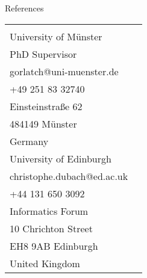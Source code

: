\documentclass[letterpaper]{resume} %
\begin{document}
\vspace{3em}
\begin{rSection}{References}

\begin{center}
  \begin{tabular}{ll}
    \begin{minipage}[t]{.45\linewidth}
      {\bf Prof. Sergei Gorlatch}\\
      University of M\"unster\\[.5em]
      PhD Supervisor\\[1em]
      gorlatch@uni-muenster.de\\
      +49 251 83 32740\\[1em]
      Einsteinstra{\ss}e 62\\
      484149 M\"unster\\
      Germany
    \end{minipage} &
    \begin{minipage}[t]{.45\linewidth}
      {\bf Assistant Prof. Christophe Dubach}\\
      University of Edinburgh\\[2.5em]
      christophe.dubach@ed.ac.uk\\
      +44 131 650 3092\\[1em]
      Informatics Forum\\
      10 Chrichton Street\\
      EH8 9AB Edinburgh\\
      United Kingdom
    \end{minipage}
  \end{tabular}
\end{center}

\end{rSection}
\end{document}

